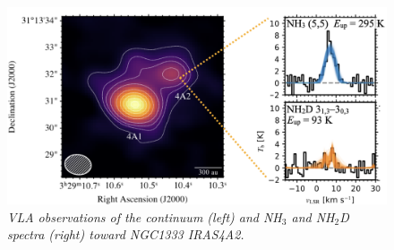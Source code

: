 \documentclass[12pt,a4paper]{article}  %
\begin{document}


\begin{figure}
\centering
\vspace{-1.5em}
\includegraphics[keepaspectratio, width=0.95\hsize]{IRAS4A_ammonia.png}
\caption{\emph{VLA observations of the continuum (left) and NH$_3$ and NH$_2$D spectra (right) toward NGC1333 IRAS4A2.}}
\label{fig:IRAS4A_VLA}
\end{figure}
\end{document}
